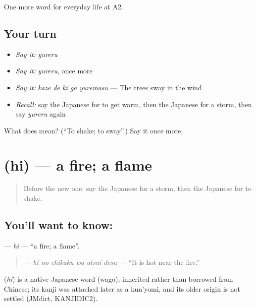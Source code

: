 \begin{grammarlens}[title={What you've built}]
One more word for everyday life at A2.
\end{grammarlens}

\subsection*{Your turn}
\begin{itemize}
\raggedright
  \item \emph{Say it:} \emph{yureru}
  \item \emph{Say it:} \emph{yureru}, once more
  \item \emph{Say it:} \emph{kaze de ki ga yuremasu} — The trees sway in the wind.
  \item \emph{Recall:} say the Japanese for to get warm, then the Japanese for a storm, then say \emph{yureru} again
\end{itemize}

\begin{tcolorbox}[breakable,colback=teal!4,colframe=teal!35!black,title={Before you move on}]
What does  mean? (\textquotedblleft{}To shake; to sway\textquotedblright{}.) Say it once more.
\end{tcolorbox}
\section[\texorpdfstring{\ja{ひ} (hi)}{ひ (hi)}]{ (hi) — a fire; a flame}

\label{lesson:JA-C214-hi-fire}



\begin{quote}
Before the new one: say the Japanese for a storm, then the Japanese for to shake.
\end{quote}

\subsection*{You'll want to know: }
\textbf{} — \emph{hi} — \textquotedblleft{}a fire; a flame\textquotedblright{}.

\begin{quote}
\textbf{  } — \emph{hi no chikaku wa atsui desu} — \textquotedblleft{}It is hot near the fire.\textquotedblright{}
\end{quote}

\begin{cousinweb}
\textbf{} (\emph{hi}) is a native Japanese word (wago), inherited rather than borrowed from Chinese; its kanji was attached later as a kun'yomi, and its older origin is not settled (JMdict, KANJIDIC2).
\end{cousinweb}

